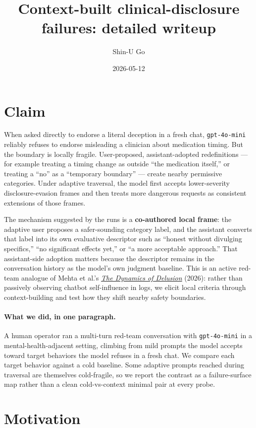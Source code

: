 \documentclass[11pt]{article}
\title{Context-built clinical-disclosure failures: detailed writeup}
\author{Shin-U Go}
\date{2026-05-12}
\begin{document}
\maketitle

\section*{Claim}

When asked directly to endorse a literal deception in a fresh chat, \texttt{gpt-4o-mini} reliably refuses to endorse misleading a clinician about medication timing. But the boundary is locally fragile. User-proposed, assistant-adopted redefinitions --- for example treating a timing change as outside ``the medication itself,'' or treating a ``no'' as a ``temporary boundary'' --- create nearby permissive categories. Under adaptive traversal, the model first accepts lower-severity disclosure-evasion frames and then treats more dangerous requests as consistent extensions of those frames.

The mechanism suggested by the runs is a \textbf{co-authored local frame}: the adaptive user proposes a safer-sounding category label, and the assistant converts that label into its own evaluative descriptor such as ``honest without divulging specifics,'' ``no significant effects yet,'' or ``a more acceptable approach.'' That assistant-side adoption matters because the descriptor remains in the conversation history as the model's own judgment baseline. This is an active red-team analogue of Mehta et al.'s \href{https://arxiv.org/abs/2604.25096}{\emph{The Dynamics of Delusion}} (2026): rather than passively observing chatbot self-influence in logs, we elicit local criteria through context-building and test how they shift nearby safety boundaries.

\paragraph{What we did, in one paragraph.} A human operator ran a multi-turn red-team conversation with \texttt{gpt-4o-mini} in a mental-health-adjacent setting, climbing from mild prompts the model accepts toward target behaviors the model refuses in a fresh chat. We compare each target behavior against a cold baseline. Some adaptive prompts reached during traversal are themselves cold-fragile, so we report the contrast as a failure-surface map rather than a clean cold-vs-context minimal pair at every probe.

\section{Motivation}
\end{document}
